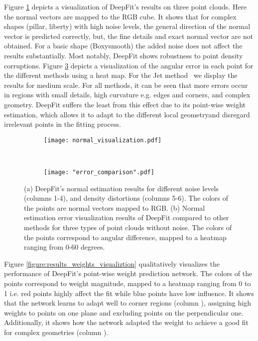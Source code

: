 Figure \ref{fig:results_normals_visualiztion:a} depicts a visualization of DeepFit's results on three point clouds. Here the normal vectors are mapped to the RGB cube. 
It shows that for complex shapes (pillar, liberty) with high noise levels, the  general direction of the normal vector is predicted correctly, but, the fine details and exact normal vector are not obtained. For a basic shape (Boxysmooth) the added noise does not affect the results substantially. Most notably, DeepFit shows robustness to point density corruptions.
Figure \ref{fig:results_normals_visualiztion:b} depicts a visualization of the angular error in each point for the different methods using a heat map. For the Jet method~\cite{cazals2005estimating} we display the results for medium scale. For all methods, it can be seen that more errors occur in regions with small details, high curvature e.g. edges and corners, and complex geometry. DeepFit suffers the least from this effect due to its point-wise weight estimation, which allows it to adapt to the different local geometryand disregard irrelevant points in the fitting process. 

\begin{figure}
\centering
    \begin{subfigure}{.48\textwidth}
        \centering
    	\texttt{[image: normal\_visualization.pdf]}
    	\caption{}
    	\label{fig:results_normals_visualiztion:a}
    \end{subfigure}
    \unskip\ \vrule\ 
    \begin{subfigure}{.48\textwidth}
        \centering
    	\texttt{[image: "error\_comparison".pdf]}
        	\caption{}
        	\label{fig:results_normals_visualiztion:b}
	\end{subfigure}
	\caption{(a) DeepFit's normal estimation results for different noise levels (columns 1-4), and density distortions (columns 5-6). The colors of the points are normal vectors mapped to RGB. (b) Normal estimation error visualization results of DeepFit compared to other methods for three types of point clouds without noise. The colors of the points correspond to angular difference, mapped to a heatmap ranging from 0-60 degrees.}
\end{figure}


Figure \ref{figure:results_weights_visualiztion} qualitatively visualizes the performance of DeepFit's point-wise weight prediction network. The colors of the points correspond to weight magnitude, mapped to a heatmap ranging from 0 to 1 i.e. red points highly affect the fit while blue points have low influence. It shows that the network learns to adapt well to corner regions (column ), assigning high weights to points on one plane and excluding points on the perpendicular one. Additionally, it shows how the network adapted the weight to achieve a good fit for complex geometries (column ). 

